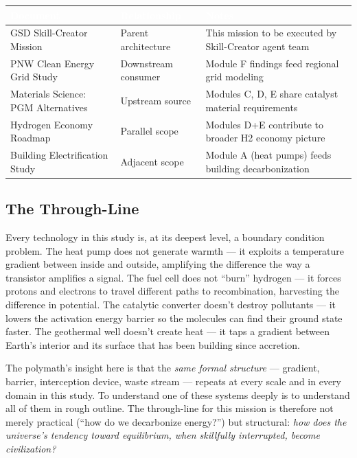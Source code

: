 \documentclass[11pt,letterpaper]{article}
\newcommand{\tableheader}[1]{\textbf{\sffamily\textcolor{white}{#1}}}
\begin{document}
\begin{center}
\begin{tabularx}{\textwidth}{L{4cm}L{4cm}X}
\toprule
{}
\tableheader{Document} & \tableheader{Relationship} & \tableheader{Notes} \\
\midrule
GSD Skill-Creator Mission & Parent architecture & This mission to be executed by Skill-Creator agent team \\
PNW Clean Energy Grid Study & Downstream consumer & Module F findings feed regional grid modeling \\
Materials Science: PGM Alternatives & Upstream source & Modules C, D, E share catalyst material requirements \\
Hydrogen Economy Roadmap & Parallel scope & Modules D+E contribute to broader H2 economy picture \\
Building Electrification Study & Adjacent scope & Module A (heat pumps) feeds building decarbonization \\
\bottomrule
\end{tabularx}
\end{center}

\subsection{The Through-Line}

Every technology in this study is, at its deepest level, a boundary condition problem. The heat pump does not generate warmth — it exploits a temperature gradient between inside and outside, amplifying the difference the way a transistor amplifies a signal. The fuel cell does not ``burn'' hydrogen — it forces protons and electrons to travel different paths to recombination, harvesting the difference in potential. The catalytic converter doesn't destroy pollutants — it lowers the activation energy barrier so the molecules can find their ground state faster. The geothermal well doesn't create heat — it taps a gradient between Earth's interior and its surface that has been building since accretion.

The polymath's insight here is that the \textit{same formal structure} — gradient, barrier, interception device, waste stream — repeats at every scale and in every domain in this study. To understand one of these systems deeply is to understand all of them in rough outline. The through-line for this mission is therefore not merely practical (``how do we decarbonize energy?'') but structural: \textit{how does the universe's tendency toward equilibrium, when skillfully interrupted, become civilization?}
\end{document}
